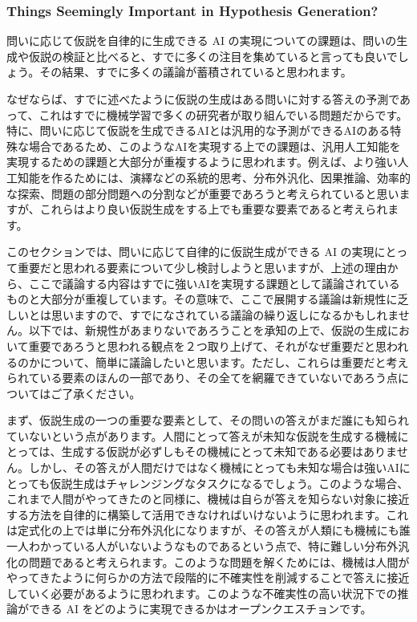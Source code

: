\subsubsection{Things Seemingly Important in Hypothesis Generation?}
問いに応じて仮説を自律的に生成できる AI の実現についての課題は、問いの生成や仮説の検証と比べると、すでに多くの注目を集めていると言っても良いでしょう。その結果、すでに多くの議論が蓄積されていると思われます。

なぜならば、すでに述べたように仮説の生成はある問いに対する答えの予測であって、これはすでに機械学習で多くの研究者が取り組んでいる問題だからです。特に、問いに応じて仮説を生成できるAIとは汎用的な予測ができるAIのある特殊な場合であるため、このようなAIを実現する上での課題は、汎用人工知能を実現するための課題と大部分が重複するように思われます。例えば、より強い人工知能を作るためには、演繹などの系統的思考、分布外汎化、因果推論、効率的な探索、問題の部分問題への分割などが重要であろうと考えられていると思いますが、これらはより良い仮説生成をする上でも重要な要素であると考えられます。

このセクションでは、問いに応じて自律的に仮説生成ができる AI の実現にとって重要だと思われる要素について少し検討しようと思いますが、上述の理由から、ここで議論する内容はすでに強いAIを実現する課題として議論されているものと大部分が重複しています。その意味で、ここで展開する議論は新規性に乏しいとは思いますので、すでになされている議論の繰り返しになるかもしれません。以下では、新規性があまりないであろうことを承知の上で、仮説の生成において重要であろうと思われる観点を２つ取り上げて、それがなぜ重要だと思われるのかについて、簡単に議論したいと思います。ただし、これらは重要だと考えられている要素のほんの一部であり、その全てを網羅できていないであろう点についてはご了承ください。

まず、仮説生成の一つの重要な要素として、その問いの答えがまだ誰にも知られていないという点があります。人間にとって答えが未知な仮説を生成する機械にとっては、生成する仮説が必ずしもその機械にとって未知である必要はありません。しかし、その答えが人間だけではなく機械にとっても未知な場合は強いAIにとっても仮説生成はチャレンジングなタスクになるでしょう。このような場合、これまで人間がやってきたのと同様に、機械は自らが答えを知らない対象に接近する方法を自律的に構築して活用できなければいけないように思われます。これは定式化の上では単に分布外汎化になりますが、その答えが人類にも機械にも誰一人わかっている人がいないようなものであるという点で、特に難しい分布外汎化の問題であると考えられます。このような問題を解くためには、機械は人間がやってきたように何らかの方法で段階的に不確実性を削減することで答えに接近していく必要があるように思われます。このような不確実性の高い状況下での推論ができる AI をどのように実現できるかはオープンクエスチョンです。

